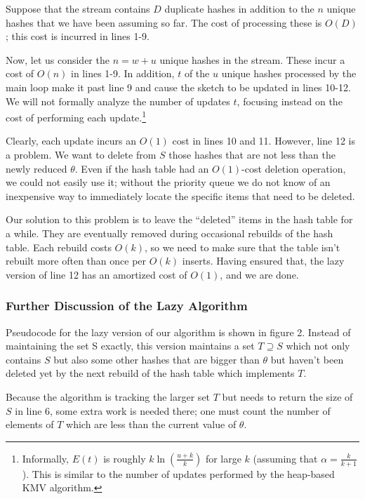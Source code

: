 \documentclass{sig-alternate}
\begin{document}
Suppose that the stream contains $D$ duplicate hashes in addition
to the $n$ unique hashes that we have been assuming so far. The cost of processing
these is $O(D)$; this cost is incurred in lines 1-9.

Now, let us consider the $n=w+u$ unique
hashes in the stream.  These incur a cost of $O(n)$ in lines 1-9. 
In addition, $t$ of the $u$ unique hashes processed by the main loop
make it past line 9 and cause the sketch to be updated in lines 10-12. We will not
formally analyze the number of updates $t$, focusing instead on the cost of
performing each update.\footnote{Informally, $E(t)$ is roughly 
$k \ln (\frac{u+k}{k})$ for large $k$ (assuming that $\alpha = \frac{k}{k+1}$).
This is similar to the number of updates performed by the heap-based KMV algorithm.}

Clearly, each update incurs an $O(1)$ cost in lines 10 and 11. 
However, line 12 is a problem. We want to delete from $S$ those
hashes that are not less than the newly reduced $\theta$. Even if the
hash table had an $O(1)$-cost deletion operation, we could not easily 
use it; without the priority queue we do not know of an inexpensive way 
to immediately locate the specific items that need to be deleted.

Our solution to this problem is to leave the ``deleted'' items in the hash table for a while.
They are eventually removed during occasional rebuilds of the hash table. Each rebuild costs $O(k)$,
so we need to make sure that the table isn't rebuilt more often than once per $O(k)$ inserts.
Having ensured that, the lazy version of line 12 has an amortized cost of $O(1)$, and we are done.

\subsubsection{Further Discussion of the Lazy Algorithm}

Pseudocode for the lazy version of our algorithm is shown in figure 2. Instead of maintaining the 
set S exactly, this version maintains a set $T \supseteq S$ which not only contains $S$ but also
some other hashes that are bigger than $\theta$ but haven't been deleted yet by the next rebuild of the 
hash table which implements $T$.

Because the algorithm is tracking the larger set $T$ but needs to return the size of $S$ in line 6, 
some extra work is needed there; one must count the number of elements of $T$ which are less than the current
value of $\theta$.
\end{document}
